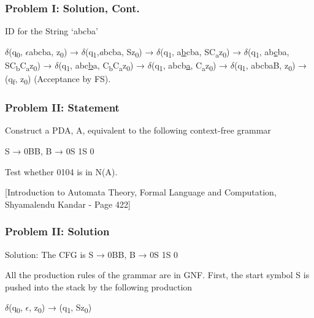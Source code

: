 \documentclass{beamer}
\begin{document}
\begin{frame}[fragile] %
	\frametitle{Problem I: Solution, Cont.}
ID for the String ‘abcba’

\begin{flushleft}
	$\delta$(q\textsubscript{0}, \underline{$\epsilon$}abcba, z\textsubscript{0}) → $\delta$(q\textsubscript{1},\emph{a}bcba, Sz\textsubscript{0}) → $\delta$(q\textsubscript{1}, a\underline{b}cba, SC\textsubscript{a}z\textsubscript{0}) → $\delta$(q\textsubscript{1}, ab\underline{c}ba, SC\textsubscript{b}C\textsubscript{a}z\textsubscript{0}) → $\delta$(q\textsubscript{1}, abc\underline{b}a, C\textsubscript{b}C\textsubscript{a}z\textsubscript{0}) → $\delta$(q\textsubscript{1}, abcb\underline{a}, C\textsubscript{a}z\textsubscript{0}) → $\delta$(q\textsubscript{1}, abcbaB, z\textsubscript{0}) → (q\textsubscript{f}, z\textsubscript{0}) (Acceptance by FS).
\end{flushleft}


\end{frame}


\begin{frame}[fragile] %
	\frametitle{Problem II: Statement}
	
	Construct a PDA, A, equivalent to the following context-free grammar
	
	\begin{center}
		S → 0BB, B → 0S \textbar{} 1S \textbar{} 0
	\end{center}
	
	Test whether 0104 is in N(A).
	
	
	[Introduction to Automata Theory, Formal Language and Computation, Shyamalendu Kandar - Page 422]
	
\end{frame}



\begin{frame}[fragile] %
	\frametitle{Problem II: Solution}
	
Solution: The CFG is S → 0BB, B → 0S \textbar{} 1S \textbar{} 0

All the production rules of the grammar are in GNF.
First, the start symbol S is pushed into the stack by the following production

	\begin{center}
		$\delta$(q\textsubscript{0}, $\epsilon$, z\textsubscript{0}) → (q\textsubscript{1}, Sz\textsubscript{0})
	\end{center}
\end{frame}
\end{document}
